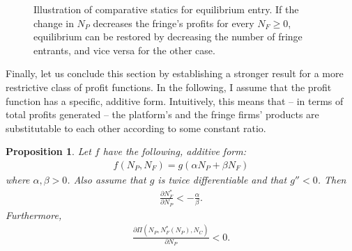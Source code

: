 \documentclass[a4paper]{article}
\newtheorem{proposition}{Proposition}
\begin{document}
\begin{figure}[ht]
    \centering
    \caption{Illustration of comparative statics for equilibrium entry. If the change in $N_P$ decreases the fringe's profits for every $N_F \geq 0$, equilibrium can be restored by decreasing the number of fringe entrants, and vice versa for the other case.}
    \label{fig:comparative_N_F}
\end{figure}

Finally, let us conclude this section by establishing a stronger result for a more restrictive class of profit functions.
In the following, I assume that the profit function has a specific, additive form.
Intuitively, this means that -- in terms of total profits generated -- the platform's and the fringe firms' products are substitutable to each other according to some constant ratio.
\begin{proposition}
    \label{prop:aggregate_size_additive}
    Let $f$ have the following, additive form:
    \begin{align*}
        f(N_P, N_F) = g(\alpha N_P + \beta N_F)
    \end{align*}
    where $\alpha, \beta > 0$.
    Also assume that $g$ is twice differentiable and that $g'' < 0$.
    Then
    \begin{align*}
        \frac{\partial N_F^*}{\partial N_P} < -\frac{\alpha}{\beta}.
    \end{align*}
    Furthermore,
    \begin{align*}
        \frac{\partial \Pi(N_P, N_F^*(N_P), N_C)}{\partial N_P} < 0.
    \end{align*}
\end{proposition}
\end{document}

